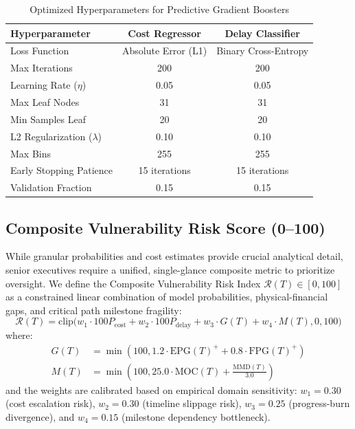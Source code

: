 \documentclass[conference]{IEEEtran}
\begin{document}
\begin{table}[htbp]
\caption{Optimized Hyperparameters for Predictive Gradient Boosters}
\begin{center}
\begin{tabular}{lcc}
\toprule
\textbf{Hyperparameter} & \textbf{Cost Regressor} & \textbf{Delay Classifier} \\
\midrule
Loss Function & Absolute Error (L1) & Binary Cross-Entropy \\
Max Iterations & 200 & 200 \\
Learning Rate ($\eta$) & 0.05 & 0.05 \\
Max Leaf Nodes & 31 & 31 \\
Min Samples Leaf & 20 & 20 \\
L2 Regularization ($\lambda$) & 0.10 & 0.10 \\
Max Bins & 255 & 255 \\
Early Stopping Patience & 15 iterations & 15 iterations \\
Validation Fraction & 0.15 & 0.15 \\
\bottomrule
\end{tabular}
\label{tab_hyperparams}
\end{center}
\end{table}

\subsection{Composite Vulnerability Risk Score (0--100)}
While granular probabilities and cost estimates provide crucial analytical detail, senior executives require a unified, single-glance composite metric to prioritize oversight. We define the Composite Vulnerability Risk Index $\mathcal{R}(T) \in [0, 100]$ as a constrained linear combination of model probabilities, physical-financial gaps, and critical path milestone fragility:
\begin{equation}
\mathcal{R}(T) = \text{clip}\Big(w_1 \cdot 100 P_{\text{cost}} + w_2 \cdot 100 P_{\text{delay}} + w_3 \cdot G(T) + w_4 \cdot M(T), 0, 100\Big)
\label{eq_risk}
\end{equation}
where:
\begin{align}
G(T) &= \min\left(100, 1.2 \cdot \text{EPG}(T)^+ + 0.8 \cdot \text{FPG}(T)^+\right) \\
M(T) &= \min\left(100, 25.0 \cdot \text{MOC}(T) + \frac{\text{MMD}(T)}{3.0}\right)
\end{align}
and the weights are calibrated based on empirical domain sensitivity: $w_1 = 0.30$ (cost escalation risk), $w_2 = 0.30$ (timeline slippage risk), $w_3 = 0.25$ (progress-burn divergence), and $w_4 = 0.15$ (milestone dependency bottleneck).
\end{document}
